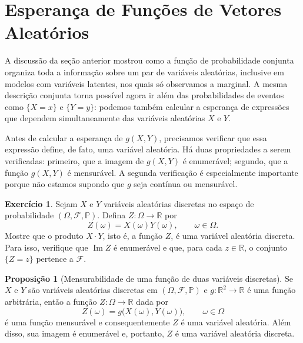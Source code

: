 \documentclass[12pt,portuguese]{article}
\theoremstyle{definition}
\newtheorem{proposition}[proposition]{Proposição}
\newtheorem{exercise}{Exercício}
\begin{document}
\section{Esperança de Funções de Vetores Aleatórios}
\label{sec:esperanca-multivariada}

A discussão da seção anterior mostrou como a função de probabilidade conjunta
organiza toda a informação sobre um par de variáveis aleatórias, inclusive em
modelos com variáveis latentes, nos quais só observamos a marginal. A mesma
descrição conjunta torna possível agora ir além das probabilidades de
eventos como $\{X=x\}$ e $\{Y=y\}$: podemos também calcular a esperança de
expressões que dependem simultaneamente das variáveis aleatórias $X$ e $Y$.

Antes de calcular a esperança de $g(X,Y)$, precisamos verificar que essa
expressão define, de fato, uma variável aleatória. Há duas propriedades a
serem verificadas: primeiro, que a imagem de $g(X,Y)$ é enumerável; segundo,
que a função $g(X,Y)$ é mensurável. A segunda verificação é especialmente
importante porque não estamos supondo que $g$ seja contínua ou mensurável.

\begin{exercise}\label{exercise:produto-va}
Sejam $X$ e $Y$ variáveis aleatórias discretas no espaço de probabilidade
$(\Omega,\mathcal{F},\mathbb{P})$. Defina $Z:\Omega\to\mathbb{R}$ por
\[
  Z(\omega) = X(\omega)Y(\omega), \qquad \omega\in\Omega.
\]
Mostre que o produto $X\cdot Y$, isto é, a função $Z$, é uma variável aleatória
discreta. Para isso, verifique que $\operatorname{Im}Z$ é enumerável e que,
para cada $z\in\mathbb{R}$, o conjunto $\{Z=z\}$ pertence a $\mathcal{F}$.
\end{exercise}

\begin{proposition}[Mensurabilidade de uma função de duas variáveis discretas]
\label{prop:mensurabilidade-g-xy}
Se $X$ e $Y$ são variáveis aleatórias discretas em
$(\Omega,\mathcal{F},\mathbb{P})$ e $g : \mathbb{R}^2 \to \mathbb{R}$ é uma
função arbitrária, então a função $Z : \Omega \to \mathbb{R}$ dada por
\begin{equation*}
  Z(\omega) = g\bigl(X(\omega),Y(\omega)\bigr),
  \qquad \omega\in\Omega
\end{equation*}
é uma função mensurável e consequentemente $Z$ é uma variável aleatória. 
Além disso, sua imagem é enumerável e, portanto,
$Z$ é uma variável aleatória discreta.
\end{proposition}
\end{document}
